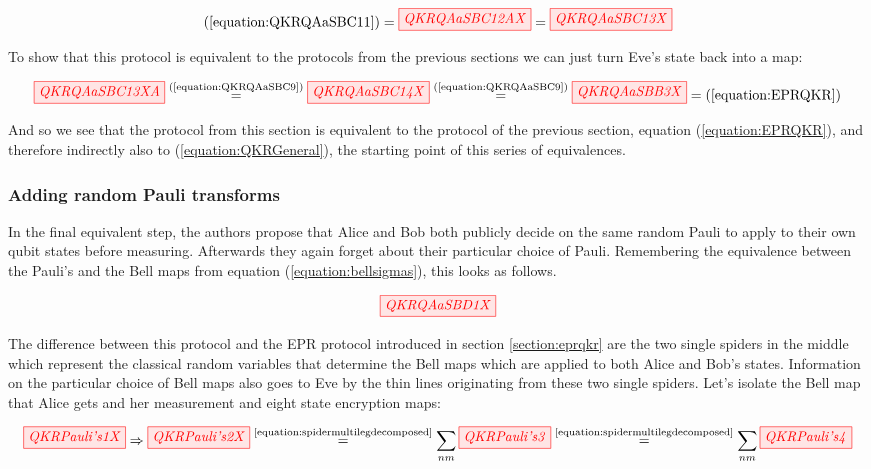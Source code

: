 \documentclass[]{article}
\newcommand{\equaltext}[1]{\ensuremath{\stackrel{\text{#1}}{=}}}
\begin{document}
\begin{equation}
	\label{equation:QKRQAaSBC13}
	(\ref{equation:QKRQAaSBC11}) = \tikzfig{QKRQAaSBC12AX} = \tikzfig{QKRQAaSBC13X}
\end{equation}

To show that this protocol is equivalent to the protocols from the previous sections we can just turn Eve's state back into a map:

\begin{equation}
\label{equation:QKRQAaSBBFinalResult}
	\tikzfig{QKRQAaSBC13XA} \equaltext{(\ref{equation:QKRQAaSBC9})} \tikzfig{QKRQAaSBC14X} \equaltext{(\ref{equation:QKRQAaSBC9})} \tikzfig{QKRQAaSBB3X} = (\ref{equation:EPRQKR})
\end{equation}

And so we see that the protocol from this section is equivalent to the protocol of the previous section, equation (\ref{equation:EPRQKR}), and therefore indirectly also to (\ref{equation:QKRGeneral}), the starting point of this series of equivalences.

\subsubsection{Adding random Pauli transforms}

In the final equivalent step, the authors propose that Alice and Bob both publicly decide on the same random Pauli to apply to their own qubit states before measuring. Afterwards they again forget about their particular choice of Pauli. Remembering the equivalence between the Pauli's and the Bell maps from equation (\ref{equation:bellsigmas}), this looks as follows.

\begin{equation}
\label{equation:QKRQAaSBD1}
\tikzfig{QKRQAaSBD1X}
\end{equation}

The difference between this protocol and the EPR protocol introduced in section \ref{section:eprqkr} are the two single spiders in the middle which represent the classical random variables that determine the Bell maps which are applied to both Alice and Bob's states. Information on the particular choice of Bell maps also goes to Eve by the thin lines originating from these two single spiders. Let's isolate the Bell map that Alice gets and her measurement and eight state encryption maps:

\begin{equation}
	\label{equation:QKRPauli's}
	\tikzfig{QKRPauli's1X} \Rightarrow \tikzfig{QKRPauli's2X} \equaltext{\ref{equation:spidermultilegdecomposed}} \sum\limits_{nm} \tikzfig{QKRPauli's3}  \equaltext{\ref{equation:spidermultilegdecomposed}} \sum\limits_{nm} \tikzfig{QKRPauli's4}
\end{equation}
\end{document}
